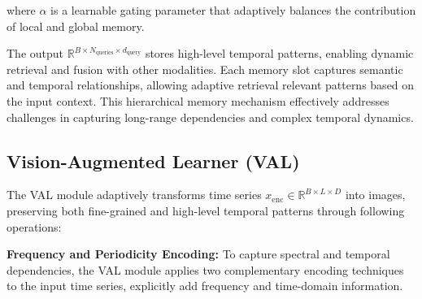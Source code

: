 where \( \alpha \) is a learnable gating parameter that adaptively balances the contribution of local and global memory.

The output \( \mathbb{R}^{B \times N_{\text{queries}} \times d_{\text{query}}} \) stores high-level temporal patterns, enabling dynamic retrieval and fusion with other modalities. Each memory slot captures semantic and temporal relationships, allowing adaptive retrieval relevant patterns based on the input context. This hierarchical memory mechanism effectively addresses challenges in capturing long-range dependencies and complex temporal dynamics.

\subsection{Vision-Augmented Learner (VAL)}

The VAL module adaptively transforms time series \( x_{\text{enc}} \in \mathbb{R}^{B \times L \times D} \) into images, preserving both fine-grained and high-level temporal patterns through following operations:

\noindent\textbf{Frequency and Periodicity Encoding:} To capture spectral and temporal dependencies, the VAL module applies two complementary encoding techniques to the input time series, explicitly add frequency and time-domain information.

